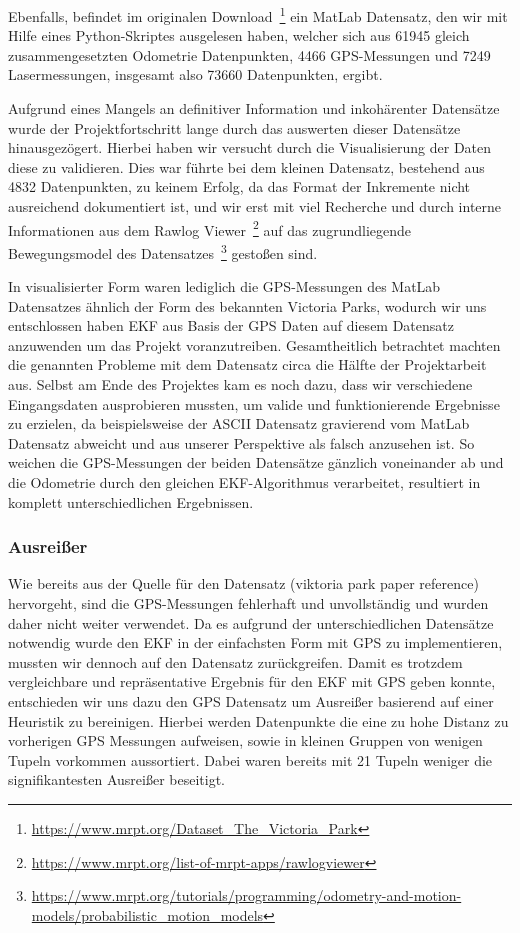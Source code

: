 \documentclass[11pt]{article}
\begin{document}
Ebenfalls, befindet im originalen Download~\footnote{\url{https://www.mrpt.org/Dataset_The_Victoria_Park}} ein MatLab Datensatz, den wir mit Hilfe eines Python-Skriptes ausgelesen haben, welcher sich aus 61945 gleich zusammengesetzten Odometrie Datenpunkten, 4466 GPS-Messungen und 7249 Lasermessungen, insgesamt also 73660 Datenpunkten, ergibt.

Aufgrund eines Mangels an definitiver Information und inkohärenter Datensätze wurde der Projektfortschritt lange durch das auswerten dieser Datensätze hinausgezögert. Hierbei haben wir versucht durch die Visualisierung der Daten diese zu validieren. Dies war führte bei dem kleinen Datensatz, bestehend aus 4832 Datenpunkten, zu keinem Erfolg, da das Format der Inkremente nicht ausreichend dokumentiert ist, und wir erst mit viel Recherche und durch interne Informationen aus dem Rawlog Viewer~\footnote{\url{https://www.mrpt.org/list-of-mrpt-apps/rawlogviewer}} auf das zugrundliegende Bewegungsmodel des Datensatzes~\footnote{\url{https://www.mrpt.org/tutorials/programming/odometry-and-motion-models/probabilistic_motion_models}} gestoßen sind.

In visualisierter Form waren lediglich die GPS-Messungen des MatLab Datensatzes ähnlich der Form des bekannten Victoria Parks, wodurch wir uns entschlossen haben EKF aus Basis der GPS Daten auf diesem Datensatz anzuwenden um das Projekt voranzutreiben.
Gesamtheitlich betrachtet machten die genannten Probleme mit dem Datensatz circa die Hälfte der Projektarbeit aus. Selbst am Ende des Projektes kam es noch dazu, dass wir verschiedene Eingangsdaten ausprobieren mussten, um valide und funktionierende Ergebnisse zu erzielen, da beispielsweise der ASCII Datensatz gravierend vom MatLab Datensatz abweicht und aus unserer Perspektive als falsch anzusehen ist. So weichen die GPS-Messungen der beiden Datensätze gänzlich voneinander ab und die Odometrie durch den gleichen EKF-Algorithmus verarbeitet, resultiert in komplett unterschiedlichen Ergebnissen.

\subsubsection{Ausreißer}
Wie bereits aus der Quelle für den Datensatz (viktoria park paper reference) hervorgeht, sind die GPS-Messungen fehlerhaft und unvollständig und wurden daher nicht weiter verwendet. Da es aufgrund der unterschiedlichen Datensätze notwendig wurde den EKF in der einfachsten Form mit GPS zu implementieren, mussten wir dennoch auf den Datensatz zurückgreifen. Damit es trotzdem vergleichbare und repräsentative Ergebnis für den EKF mit GPS geben konnte, entschieden wir uns dazu den GPS Datensatz um Ausreißer basierend auf einer Heuristik zu bereinigen. Hierbei werden Datenpunkte die eine zu hohe Distanz zu vorherigen GPS Messungen aufweisen, sowie in kleinen Gruppen von wenigen Tupeln vorkommen aussortiert. Dabei waren bereits mit 21 Tupeln weniger die signifikantesten Ausreißer beseitigt.
\end{document}
